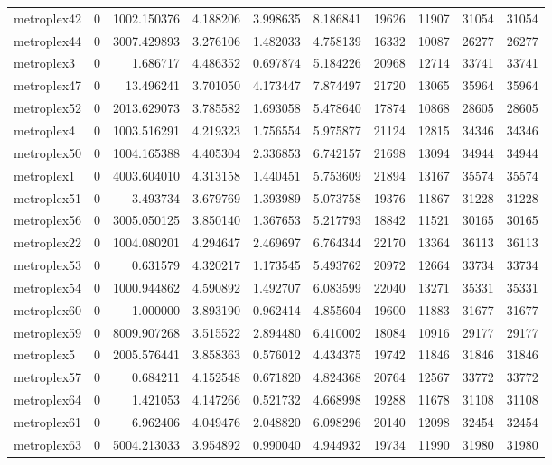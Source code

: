 \begin{longtable}{|l|r|r|r|r|r|r|r|r|r|}
metroplex42 & 0 & 1002.150376 & 4.188206 & 3.998635 & 8.186841 & 19626 & 11907 & 31054 & 31054 \\
metroplex44 & 0 & 3007.429893 & 3.276106 & 1.482033 & 4.758139 & 16332 & 10087 & 26277 & 26277 \\
metroplex3 & 0 & 1.686717 & 4.486352 & 0.697874 & 5.184226 & 20968 & 12714 & 33741 & 33741 \\
metroplex47 & 0 & 13.496241 & 3.701050 & 4.173447 & 7.874497 & 21720 & 13065 & 35964 & 35964 \\
metroplex52 & 0 & 2013.629073 & 3.785582 & 1.693058 & 5.478640 & 17874 & 10868 & 28605 & 28605 \\
metroplex4 & 0 & 1003.516291 & 4.219323 & 1.756554 & 5.975877 & 21124 & 12815 & 34346 & 34346 \\
metroplex50 & 0 & 1004.165388 & 4.405304 & 2.336853 & 6.742157 & 21698 & 13094 & 34944 & 34944 \\
metroplex1 & 0 & 4003.604010 & 4.313158 & 1.440451 & 5.753609 & 21894 & 13167 & 35574 & 35574 \\
metroplex51 & 0 & 3.493734 & 3.679769 & 1.393989 & 5.073758 & 19376 & 11867 & 31228 & 31228 \\
metroplex56 & 0 & 3005.050125 & 3.850140 & 1.367653 & 5.217793 & 18842 & 11521 & 30165 & 30165 \\
metroplex22 & 0 & 1004.080201 & 4.294647 & 2.469697 & 6.764344 & 22170 & 13364 & 36113 & 36113 \\
metroplex53 & 0 & 0.631579 & 4.320217 & 1.173545 & 5.493762 & 20972 & 12664 & 33734 & 33734 \\
metroplex54 & 0 & 1000.944862 & 4.590892 & 1.492707 & 6.083599 & 22040 & 13271 & 35331 & 35331 \\
metroplex60 & 0 & 1.000000 & 3.893190 & 0.962414 & 4.855604 & 19600 & 11883 & 31677 & 31677 \\
metroplex59 & 0 & 8009.907268 & 3.515522 & 2.894480 & 6.410002 & 18084 & 10916 & 29177 & 29177 \\
metroplex5 & 0 & 2005.576441 & 3.858363 & 0.576012 & 4.434375 & 19742 & 11846 & 31846 & 31846 \\
metroplex57 & 0 & 0.684211 & 4.152548 & 0.671820 & 4.824368 & 20764 & 12567 & 33772 & 33772 \\
metroplex64 & 0 & 1.421053 & 4.147266 & 0.521732 & 4.668998 & 19288 & 11678 & 31108 & 31108 \\
metroplex61 & 0 & 6.962406 & 4.049476 & 2.048820 & 6.098296 & 20140 & 12098 & 32454 & 32454 \\
metroplex63 & 0 & 5004.213033 & 3.954892 & 0.990040 & 4.944932 & 19734 & 11990 & 31980 & 31980 \\

\end{longtable}
